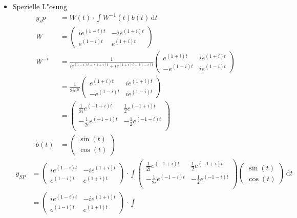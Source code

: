 \documentclass[fleqn,12pt]{scrartcl}
\newcommand{\id}{\, \mathrm{d}}
\begin{document}
\begin{itemize}
\item
Spezielle L"osung
\begin{align*}
	y_sp &= W(t) \cdot \int W^{-1}(t)b(t) \id t\\
	W &= \begin{pmatrix} 
		ie^{(1-i)t} & -ie^{(1+i)t}\\
e^{(1-i)t} & e^{(1+i)t}
\end{pmatrix}\\
W^{-i} &= \frac1{ie^{(1-i)t+(1+i)t} + ie^{(1+i)t+(1-i)t}}\begin{pmatrix}
e^{(1+i)t} & ie^{(1+i)t}\\
-e^{(1-i)t} & ie^{(1-i)t} \end{pmatrix}\\
&= \frac{1}{2ie^{2t}}
\begin{pmatrix}
e^{(1+i)t} & ie^{(1+i)t}\\
-e^{(1-i)t} & ie^{(1-i)t} \end{pmatrix}\\
										 &= \begin{pmatrix}
	\frac1{2i} e^{(-1+i)t} & \frac12 e^{(-1+i)t}\\
	-\frac{1}{2i} e^{(-1-i)t} & -\frac12 e^{(-1-i)t}\\
\end{pmatrix}\\
b(t) &= \begin{pmatrix}\sin(t)\\\cos(t)\end{pmatrix}
\end{align*}
\begin{align*}
	y_{SP} &= 
	\begin{pmatrix} 
		ie^{(1-i)t} & -ie^{(1+i)t}\\
e^{(1-i)t} & e^{(1+i)t}
\end{pmatrix} \cdot \int
\begin{pmatrix}
	\frac1{2i} e^{(-1+i)t} & \frac12 e^{(-1+i)t}\\
	-\frac{1}{2i} e^{(-1-i)t} & -\frac12 e^{(-1-i)t}\\
\end{pmatrix} \begin{pmatrix} \sin(t) \\ \cos(t) \end{pmatrix} \id t \\
	&=
	\begin{pmatrix} 
		ie^{(1-i)t} & -ie^{(1+i)t}\\
e^{(1-i)t} & e^{(1+i)t}
\end{pmatrix} \cdot \int

\end{align*}
\end{itemize}
\end{document}
